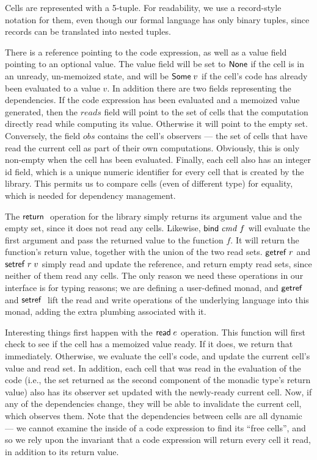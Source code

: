 Cells are represented with a 5-tuple. For readability, we use a
record-style notation for them, even though our formal language has
only binary tuples, since records can be translated into nested
tuples.

There is a reference pointing to the code expression, as well as a
value field pointing to an optional value. The value field will be set
to $\mathsf{None}$ if the cell is in an unready, un-memoized state, and
will be $\mathsf{Some}\;v$ if the cell's code has already been
evaluated to a value $v$. In addition there are two fields
representing the dependencies. If the code expression has been
evaluated and a memoized value generated, then the $reads$ field will
point to the set of cells that the computation directly read while
computing its value. Otherwise it will point to the empty
set. Conversely, the field $obs$ contains the cell's observers --- the
set of cells that have read the current cell as part of their own
computations. Obviously, this is only non-empty when the cell has been
evaluated. Finally, each cell also has an integer id field, which is a
unique numeric identifier for every cell that is created by the
library. This permits us to compare cells (even of different type) for
equality, which is needed for dependency management.

The $\mathsf{return}\;$ operation for the library simply returns its argument
value and the empty set, since it does not read any cells. Likewise,
$\mathsf{bind}\; \mathit{cmd}\;f$ will evaluate the first argument and pass the returned
value to the function $f$. It will return the function's return value,
together with the union of the two read sets. $\mathsf{getref}\; r$ and $\mathsf{setref}\;
r\;v$ simply read and update the reference, and return empty read
sets, since neither of them read any cells. The only reason we need 
these operations in our interface is for typing reasons; we are defining
a user-defined monad, and $\mathsf{getref}\;$ and $\mathsf{setref}\;$ lift the read and
write operations of the underlying language into this monad, adding 
the extra plumbing associated with it.

Interesting things first happen with the $\mathsf{read}\; e$ operation. This
function will first check to see if the cell has a memoized value
ready. If it does, we return that immediately. Otherwise, we evaluate
the cell's code, and update the current cell's value and read set. In
addition, each cell that was read in the evaluation of the code (i.e.,
the set returned as the second component of the monadic type's return
value) also has its observer set updated with the newly-ready current
cell. Now, if any of the dependencies change, they will be able to
invalidate the current cell, which observes them. Note that the
dependencies between cells are all dynamic --- we cannot examine the
inside of a code expression to find its ``free cells'', and so we rely
upon the invariant that a code expression will return every cell it
read, in addition to its return value.


